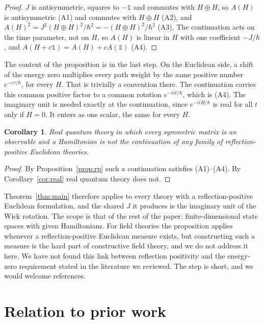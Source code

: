\documentclass[11pt]{article}
\newtheorem{corollary}[theorem]{Corollary}
\theoremstyle{remark}
\newcommand{\one}{\mathbb{1}}
\begin{document}
\begin{proof}
$J$ is antisymmetric, squares to $-\one$ and commutes with $H\oplus H$, so $A(H)$ is antisymmetric (A1) and commutes with $H\oplus H$ (A2), and $A(H)^2=J^2(H\oplus H)^2/\hbar^2=-(H\oplus H)^2/\hbar^2$ (A3). The continuation acts on the time parameter, not on $H$, so $A(H)$ is linear in $H$ with one coefficient $-J/\hbar$, and $A(H+c\one)=A(H)+cA(\one)$ (A4).
\end{proof}

The content of the proposition is in the last step. On the Euclidean side, a shift of the energy zero multiplies every path weight by the same positive number $e^{-c\tau/\hbar}$, for every $H$. That is trivially a convention there. The continuation carries this common positive factor to a common rotation $e^{-ict/\hbar}$, which is (A4). The imaginary unit is needed exactly at the continuation, since $e^{-itH/\hbar}$ is real for all $t$ only if $H=0$. It enters as one scalar, the same for every $H$.

\begin{corollary}\label{cor:rp}
Real quantum theory in which every symmetric matrix is an observable and a Hamiltonian is not the continuation of any family of reflection-positive Euclidean theories.
\end{corollary}

\begin{proof}
By Proposition~\ref{prop:rp} such a continuation satisfies (A1)--(A4). By Corollary~\ref{cor:real} real quantum theory does not.
\end{proof}

Theorem~\ref{thm:main} therefore applies to every theory with a reflection-positive Euclidean formulation, and the shared $J$ it produces is the imaginary unit of the Wick rotation. The scope is that of the rest of the paper: finite-dimensional state spaces with given Hamiltonians. For field theories the proposition applies whenever a reflection-positive Euclidean measure exists, but constructing such a measure is the hard part of constructive field theory, and we do not address it here. We have not found this link between reflection positivity and the energy-zero requirement stated in the literature we reviewed. The step is short, and we would welcome references.

\section{Relation to prior work}
\end{document}
